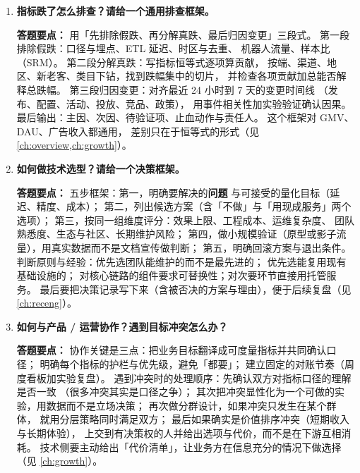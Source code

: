 \begin{interview}[题库与答题要点]
\begin{enumerate}[label=]
  \item[\textcolor{VioletDeep}{\textbf{Q135.}}] \textbf{指标跌了怎么排查？请给一个通用排查框架。}
\par\smallskip\noindent\textcolor{VioletDeep}{\textbf{答题要点：}}
用「先排除假跌、再分解真跌、最后归因变更」三段式。
第一段排除假跌：口径与埋点、ETL 延迟、时区与去重、
机器人流量、样本比（SRM）。
第二段分解真跌：写指标恒等式逐项算贡献，
按端、渠道、地区、新老客、类目下钻，找到跌幅集中的切片，
并检查各项贡献加总能否解释总跌幅。
第三段归因变更：对齐最近 24 小时到 7 天的变更时间线
（发布、配置、活动、投放、竞品、政策），
用事件相关性加实验验证确认因果。
最后输出：主因、次因、待验证项、止血动作与责任人。
这个框架对 GMV、DAU、广告收入都通用，
差别只在于恒等式的形式（见 \cref{ch:overview,ch:growth}）。

  \item[\textcolor{VioletDeep}{\textbf{Q136.}}] \textbf{如何做技术选型？请给一个决策框架。}
\par\smallskip\noindent\textcolor{VioletDeep}{\textbf{答题要点：}}
五步框架：第一，明确要解决的\textbf{问题}
与可接受的量化目标（延迟、精度、成本）；
第二，列出候选方案（含「不做」与「用现成服务」两个选项）；
第三，按同一组维度评分：效果上限、工程成本、运维复杂度、
团队熟悉度、生态与社区、长期维护风险；
第四，做小规模验证（原型或影子流量），用真实数据而不是文档宣传做判断；
第五，明确回滚方案与退出条件。
判断原则与经验：优先选团队能维护的而不是最先进的；
优先选能复用现有基础设施的；
对核心链路的组件要求可替换性；对次要环节直接用托管服务。
最后要把决策记录写下来（含被否决的方案与理由），便于后续复盘（见 \cref{ch:receng}）。

  \item[\textcolor{VioletDeep}{\textbf{Q137.}}] \textbf{如何与产品 / 运营协作？遇到目标冲突怎么办？}
\par\smallskip\noindent\textcolor{VioletDeep}{\textbf{答题要点：}}
协作关键是三点：把业务目标翻译成可度量指标并共同确认口径；
明确每个指标的护栏与优先级，避免「都要」；
建立固定的对账节奏（周度看板加实验复盘）。
遇到冲突时的处理顺序：先确认双方对指标口径的理解是否一致
（很多冲突其实是口径之争）；
其次把冲突显性化为一个可做的实验，用数据而不是立场决策；
再次做分群设计，如果冲突只发生在某个群体，
就用分层策略同时满足双方；
最后如果确实是价值排序冲突（短期收入与长期体验），
上交到有决策权的人并给出选项与代价，而不是在下游互相消耗。
技术侧要主动给出「代价清单」，让业务方在信息充分的情况下做选择（见 \cref{ch:growth}）。


\end{enumerate}
\end{interview}
